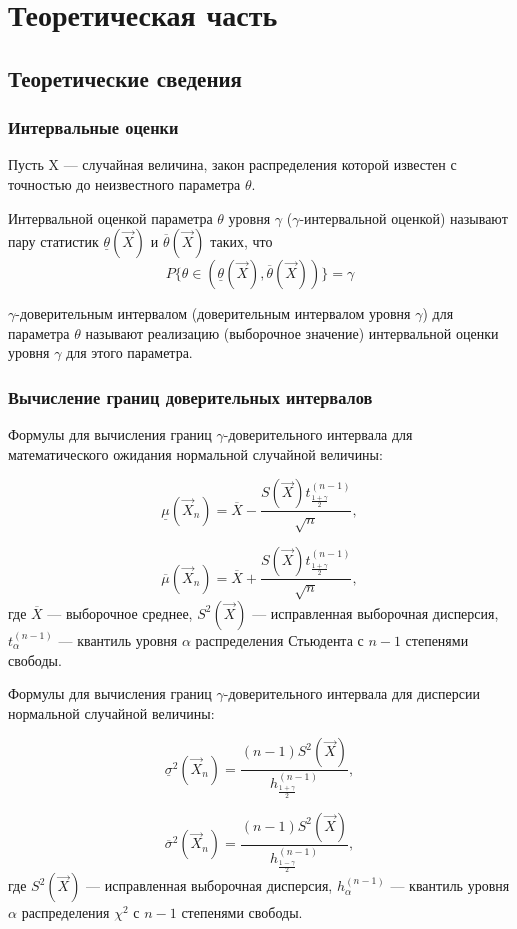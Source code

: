 \chapter{Теоретическая часть}

\section{Теоретические сведения}

\subsection{Интервальные оценки}

Пусть X --- случайная величина, закон распределения которой известен с точностью до неизвестного параметра $\theta$. 

Интервальной оценкой параметра $\theta$ уровня $\gamma$ ($\gamma$-интервальной оценкой) называют пару статистик $\underline{\theta}(\vec X) \text{ и } \overline{\theta}(\vec X)$ таких, что $$P\{\theta \in (\underline{\theta}(\vec X), \overline{\theta}(\vec X))\}=\gamma$$ 

$\gamma$-доверительным интервалом (доверительным интервалом уровня $\gamma$) для параметра $\theta$ называют реализацию (выборочное значение) интервальной оценки уровня $\gamma$ для этого параметра.

\subsection{Вычисление границ доверительных интервалов}

Формулы для вычисления границ $\gamma$-доверительного интервала для математического ожидания нормальной случайной величины:

$$
\underline\mu(\vec X_n)=\overline X - \frac{S(\vec X)t^{(n-1)}_{\frac{1+\gamma}{2}}}{\sqrt{n}},
$$

$$
\overline\mu(\vec X_n)=\overline X + \frac{S(\vec X)t^{(n-1)}_{\frac{1+\gamma}{2}}}{\sqrt{n}},
$$
где $\overline X$ --- выборочное среднее, $S^2(\vec X)$ --- исправленная выборочная дисперсия, $t^{(n-1)}_{\alpha}$ --- квантиль уровня $\alpha$ распределения Стьюдента с $n-1$ степенями свободы.

Формулы для вычисления границ $\gamma$-доверительного интервала для дисперсии нормальной случайной величины:

$$
\underline\sigma^2(\vec X_n)= \frac{(n-1)S^2(\vec X)}{h^{(n-1)}_{\frac{1+\gamma}{2}}},
$$

$$
\overline\sigma^2(\vec X_n)= \frac{(n-1)S^2(\vec X)}{h^{(n-1)}_{\frac{1-\gamma}{2}}},
$$
где $S^2(\vec X)$ --- исправленная выборочная дисперсия, $h^{(n-1)}_{\alpha}$ --- квантиль уровня $\alpha$ распределения $\chi^2$ с $n - 1$ степенями свободы.

